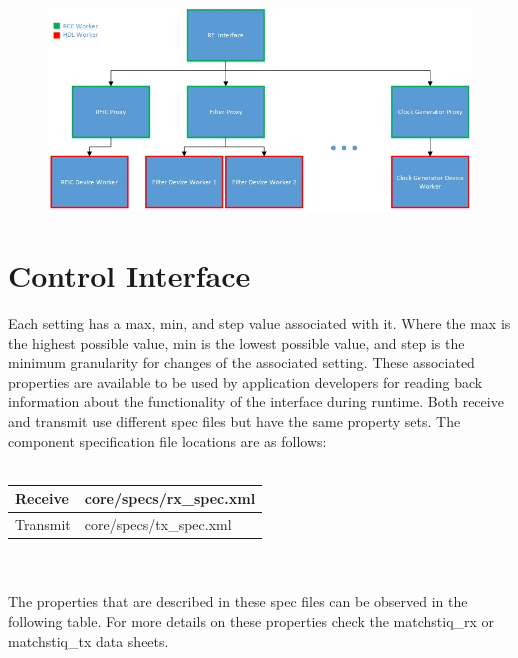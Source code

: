 	\begin{figure}[h]
	 	\centering
	 	\includegraphics[scale=0.75]{figures/Generic_FE_diagram.jpg}
	\end{figure}
\newpage
\section{Control Interface}
Each setting has a max, min, and step value associated with it.  Where the max is the highest possible value, min is the lowest possible value, and step is the minimum granularity for changes of the associated setting.  These associated properties are available to be used by application developers for reading back information about the functionality of the interface during runtime.  Both receive and transmit use different spec files but have the same property sets. The component specification file locations are as follows: \\ \\
   \begin{tabular}{|p{2cm}|p{7cm}|}
      \hline
      Receive & core/specs/rx\_spec.xml \\
      \hline
      Transmit & core/specs/tx\_spec.xml  \\
      \hline
   \end{tabular}
   \\ \medskip \\
The properties that are described in these spec files can be observed in the following table.  For more details on these properties check the matchstiq\_rx or matchstiq\_tx data sheets. \\ \\
